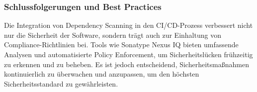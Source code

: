 \subsubsection{Schlussfolgerungen und Best Practices}

Die Integration von Dependency Scanning in den CI/CD-Prozess verbessert nicht nur die Sicherheit der Software, sondern trägt auch zur Einhaltung von Compliance-Richtlinien bei. Tools wie Sonatype Nexus IQ bieten umfassende Analysen und automatisierte Policy Enforcement, um Sicherheitslücken frühzeitig zu erkennen und zu beheben. Es ist jedoch entscheidend, Sicherheitsmaßnahmen kontinuierlich zu überwachen und anzupassen, um den höchsten Sicherheitsstandard zu gewährleisten.